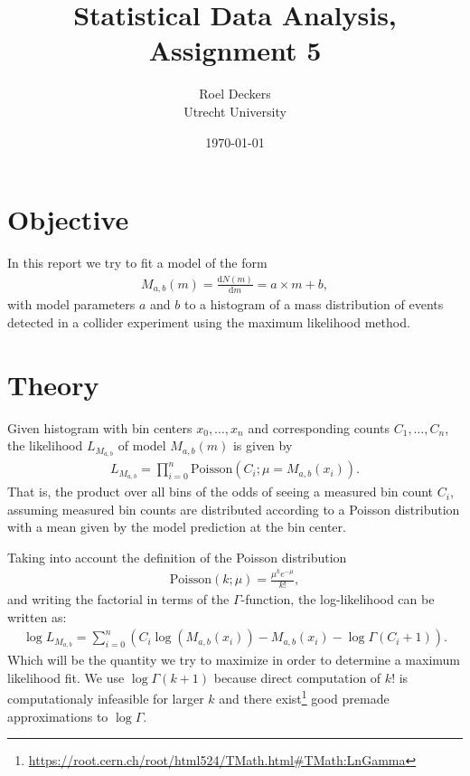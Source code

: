 \documentclass[notitlepage, 12pt, a4paper, twoside, titlepage]{article}
\title{Statistical Data Analysis, Assignment 5}
\author{Roel Deckers  \\
	Utrecht University
	}
\date{\today}
\begin{document}
\maketitle

\section{Objective}
In this report we try to fit a model of the form
\begin{align}
	M_{a,b}(m) = \frac{\text{d}N(m)}{\text{d}m} = a \times m + b,
\end{align}
with model parameters $a$ and $b$ to a histogram of a mass distribution of events detected in a collider experiment using the maximum likelihood method.

\section{Theory}
Given histogram with bin centers $x_0,\ldots,x_n$ and corresponding counts $C_1,\ldots,C_n$, the likelihood $L_{M_{a,b}}$ of model $M_{a,b}(m)$ is given by
\begin{align}
	L_{M_{a,b}} = \prod_{i=0}^n\text{Poisson}(C_i;\mu = M_{a,b}(x_i)).
\end{align}
That is, the product over all bins of the odds of seeing a measured bin count $C_i$, assuming measured bin counts are distributed according to a Poisson distribution with a mean given
by the model prediction at the bin center.
 \par Taking into account the definition of the Poisson distribution
\begin{align}
	\text{Poisson}(k; \mu) = \frac{\mu^k e^{-\mu}}{k!},
\end{align}
 and writing the factorial in terms of the $\Gamma$-function, the log-likelihood can be written as:
\begin{align}
		\log L_{M_{a,b}} = \sum_{i=0}^n \left(C_i\log(M_{a,b}(x_i)) - M_{a,b}(x_i) - \log\Gamma(C_i+1)\right).
\end{align}
Which will be the quantity we try to maximize in order to determine a maximum likelihood fit. We use $\log\Gamma(k+1)$ because direct computation of $k!$ is computationaly
infeasible for larger $k$ and there exist\footnote{\url{https://root.cern.ch/root/html524/TMath.html#TMath:LnGamma}} good premade approximations to $\log\Gamma$.
\end{document}
